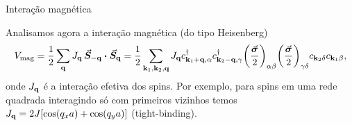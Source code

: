 \documentclass[aspectratio=169,xcolor={table,dvipsnames,usenames}]{beamer}
\begin{document}
\begin{frame}{Interação magnética}

Analisamos agora a interação magnética (do tipo Heisenberg)
$$
V_{\text{mag}} = \frac{1}{2} \sum_{\q} J_{\q} \, \va*{S}_{-\q} \vdot \va*{S}_{\q} =
\frac{1}{2} \sum_{\k_1,\k_2,\q} J_{\q} c_{\k_1+\q,\alpha}^\d c_{\k_2-\q,\gamma}^\d
\qty(\frac{\va*{\s}}{2})_{\alpha\beta} \qty(\frac{\va*{\s}}{2})_{\gamma\delta} c_{\k_2\delta} c_{\k_1\beta},
$$
onde $J_{\vb{q}}$ é a interação efetiva dos spins. Por exemplo, para spins em uma rede quadrada interagindo só com primeiros vizinhos temos $J_{\vb{q}} = 2 J [\cos(q_x a) + \cos(q_y a)]$ (tight-binding).

\end{frame}
\end{document}
